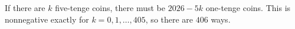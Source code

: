 If there are $k$ five-tenge coins, there must be $2026-5k$ one-tenge coins. This is nonnegative exactly for $k=0,1,\ldots,405$, so there are $\boxed{406}$ ways.
